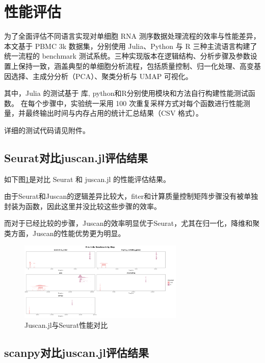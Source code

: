 \section{性能评估}

为了全面评估不同语言实现对单细胞 RNA 测序数据处理流程的效率与性能差异，本文基于 PBMC 3k 数据集，分别使用 Julia、Python 与 R 三种主流语言构建了统一流程的 benchmark 测试系统。三种实现版本在逻辑结构、分析步骤及参数设置上保持一致，涵盖典型的单细胞分析流程，包括质量控制、归一化处理、高变基因选择、主成分分析（PCA）、聚类分析与 UMAP 可视化。

其中，Julia 的测试基于 库, python和R分别使用模块和方法自行构建性能测试函数。
在每个步骤中，实验统一采用 100 次重复采样方式对每个函数进行性能测量，并最终输出时间与内存占用的统计汇总结果（CSV 格式）。

详细的测试代码请见附件。

\subsection{Seurat对比juscan.jl评估结果}

如下图\ref{img:r_vs_julia}是对比 Seurat 和 juscan.jl 的性能评估结果。

由于Seurat和Juscan的逻辑差异比较大，fiter和计算质量控制矩阵步骤没有被单独封装为函数，因此这里并没比较这些步骤的效率。

而对于已经比较的步骤，Juscan的效率明显优于Seurat，尤其在归一化，降维和聚类方面，Juscan的性能优势更为明显。

\begin{figure}[htbp]
  \centering
  \includegraphics[width=0.7\textwidth]{img/r_vs_julia.png}
  \caption{Juscan.jl与Seurat性能对比}
  \label{img:r_vs_julia}
\end{figure}

\subsection{scanpy对比juscan.jl评估结果}


